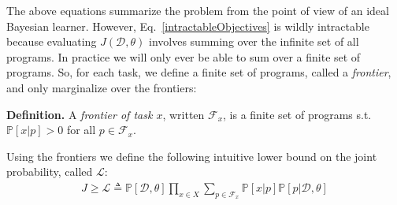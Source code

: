 \documentclass{article}
\newcommand{\lowerBound}{\mathscr{L}}
\newcommand{\probability}{\mathds{P}} %
\begin{document}



The above equations summarize the problem from the point of view of an ideal Bayesian learner.
However, Eq.~\ref{intractableObjectives}
is wildly intractable because evaluating $J(\mathcal{D},\theta)$ involves
summing over the  infinite set of all programs.
In practice we will only ever be able to sum over a finite set of programs.
So, for each task, we define a finite set of programs, called a \emph{frontier}, and only marginalize over the frontiers:

\noindent\textbf{Definition.} A \emph{frontier of task $x$}, written $\mathcal{F}_x$,
is a finite set of programs s.t. $\probability[x|p] > 0$ for all $p\in \mathcal{F}_x$.

Using the frontiers we  define the following intuitive lower bound on the joint probability, called $\lowerBound$:
\begin{align}
 J\geq \lowerBound\triangleq\probability[\mathcal{D},\theta]\prod_{x\in X} \sum_{p\in \mathcal{F}_x} \probability[x|p]\probability[p|\mathcal{D},\theta]
\end{align}


\end{document}

